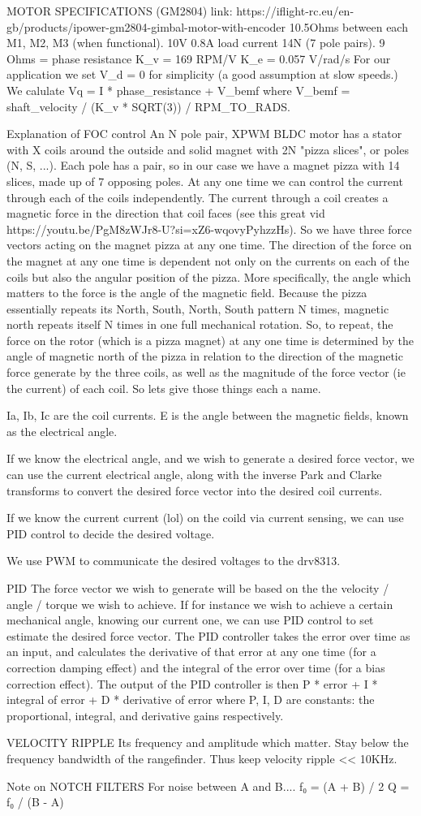 MOTOR SPECIFICATIONS (GM2804)
link: https://iflight-rc.eu/en-gb/products/ipower-gm2804-gimbal-motor-with-encoder
10.5Ohms between each M1, M2, M3 (when functional).
10V
0.8A load current
14N (7 pole pairs).
9 Ohms = phase resistance
K_v = 169 RPM/V
K_e = 0.057 V/rad/s
For our application we set V_d = 0 for simplicity (a good assumption at slow speeds.)
We calulate Vq = I * phase_resistance + V_bemf
where V_bemf = shaft_velocity / (K_v * SQRT(3)) / RPM_TO_RADS.


Explanation of FOC control
An N pole pair, XPWM BLDC motor has a stator with X coils around the outside and solid magnet with 2N "pizza slices", or poles (N, S, ...).
Each pole has a pair, so in our case we have a magnet pizza with 14 slices, made up of 7 opposing poles.
At any one time we can control the current through each of the coils independently.
The current through a coil creates a magnetic force in the direction that coil faces (see this great vid https://youtu.be/PgM8zWJr8-U?si=xZ6-wqovyPyhzzHs).
So we have three force vectors acting on the magnet pizza at any one time.
The direction of the force on the magnet at any one time is dependent not only on the currents on each of the coils but also the angular 
position of the pizza.
More specifically, the angle which matters to the force is the angle of the magnetic field.
Because the pizza essentially repeats its North, South, North, South pattern N times, magnetic north repeats itself N times in one full mechanical
rotation.
So, to repeat, the force on the rotor (which is a pizza magnet) at any one time is determined by the angle of magnetic north of the pizza in
relation to the direction of the magnetic force generate by the three coils, as well as the magnitude of the force vector (ie the current) 
of each coil.
So lets give those things each a name.

Ia, Ib, Ic are the coil currents.
E is the angle between the magnetic fields, known as the electrical angle.

If we know the electrical angle, and we wish to generate a desired force vector, we can use the current electrical angle, along with the 
inverse Park and Clarke transforms to convert the desired force vector into the desired coil currents.

If we know the current current (lol) on the coild via current sensing, we can use PID control to decide the desired voltage.

We use PWM to communicate the desired voltages to the drv8313.


PID
The force vector we wish to generate will be based on the the velocity / angle / torque we wish to achieve.
If for instance we wish to achieve a certain mechanical angle, knowing our current one, we can use PID control to set estimate the desired
force vector.
The PID controller takes the error over time as an input, and calculates the derivative of that error at any one time (for a correction damping effect)
and the integral of the error over time (for a bias correction effect). The output of the PID controller is then
P * error + I * integral of error + D * derivative of error
where P, I, D are constants: the proportional, integral, and derivative gains respectively.


VELOCITY RIPPLE
Its frequency and amplitude which matter. Stay below the frequency bandwidth of the rangefinder. Thus keep velocity ripple << 10KHz.

Note on NOTCH FILTERS
For noise between A and B....
f₀ = (A + B) / 2
Q  = f₀ / (B - A)